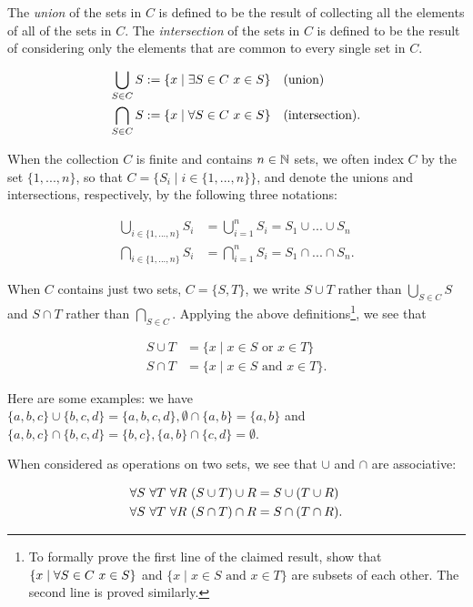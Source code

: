 The \textit{union} of the sets in $C$ is defined to be the result of collecting all the elements of all of the sets in $C$. The \textit{intersection} of the sets in $C$ is defined to be the result of considering only the elements that are common to every single set in $C$.

\begin{align*}
    \bigcup_{S \in C} S &:= \{ x \mid \exists S \in C \text{ } x \in S \} \quad \text{(union)} \\
    \bigcap_{S \in C} S &:= \{ x \mid \forall S \in C \text{ } x \in S \} \quad \text{(intersection)}.
\end{align*}

When the collection $C$ is finite and contains $n \in \mathbb{N}$ sets, we often index $C$ by the set $\{1, ..., n\}$, so that $C = \{S_i \mid i \in \{1, ..., n\}\}$, and denote the unions and intersections, respectively, by the following three notations:

\begin{align*}
    \bigcup_{i \in \{1, ..., n\}} S_i &= \bigcup_{i = 1}^n S_i = S_1 \cup ... \cup S_n \\
    \bigcap_{i \in \{1, ..., n\}} S_i &= \bigcap_{i = 1}^n S_i = S_1 \cap ... \cap S_n.
\end{align*}

When $C$ contains just two sets, $C = \{S, T\}$, we write $S \cup T$ rather than $\bigcup_{S \in C} S$ and $S \cap T$ rather than $\bigcap_{S \in C}$. Applying the above definitions\footnote{To formally prove the first line of the claimed result, show that $ \{ x \mid \forall S \in C \text{ } x \in S \}$ and $\{x \mid x \in S \text{ and } x \in T\}$ are subsets of each other. The second line is proved similarly.}, we see that

\begin{align*}
    S \cup T &= \{x \mid x \in S \text{ or } x \in T\} \\
    S \cap T &= \{x \mid x \in S \text{ and } x \in T\}.
\end{align*}

Here are some examples: we have $\{a, b, c\} \cup \{b, c, d\} = \{a, b, c, d\}, \emptyset \cap \{a, b\} = \{a, b\}$ and $\{a, b, c\} \cap \{b, c, d\} = \{b, c\}, \{a, b\} \cap \{c, d\} = \emptyset$.

When considered as operations on two sets, we see that $\cup$ and $\cap$ are associative:

\begin{align*}
    \forall S \text{ } \forall T \text{ } \forall R \text{ } (S \cup T) \cup R &= S \cup (T \cup R) \\
    \forall S \text{ } \forall T \text{ } \forall R \text{ } (S \cap T) \cap R &= S \cap (T \cap R).
\end{align*}

